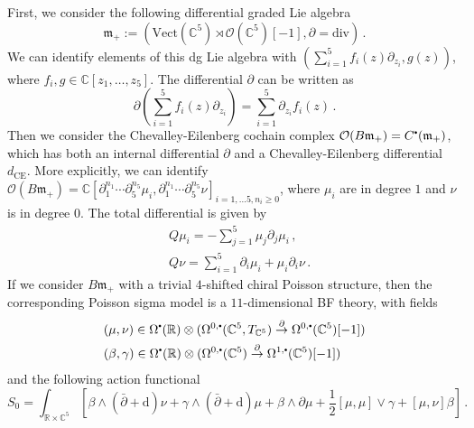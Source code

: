 \documentclass[11pt]{article}
\newcommand{\C}{\mathbb{C}}
\newcommand{\R}{\mathbb{R}}
\newcommand{\CE}{Chevalley-Eilenberg }
\newcommand\sbullet[1][.5]{\mathbin{\vcenter{\hbox{\scalebox{#1}{$\bullet$}}}}}
\numberwithin{equation}{section}
\begin{document}
First, we consider the following differential graded Lie algebra
\begin{equation}
\mathfrak{m}_+ := (\mathrm{Vect}(\C^5) \rtimes \mathcal{O}(\C^5)[-1], \partial = \mathrm{div} )\,.
\end{equation}
We can identify elements of this dg Lie algebra with $(\sum_{i=1}^5f_i(z)\partial_{z_i},g(z))$, where $f_i,g \in \C[z_1,\dots,z_5]$. The differential $\partial$ can be written as
\begin{equation}
	\partial(\sum_{i=1}^5f_i(z)\partial_{z_i}) = \sum_{i=1}^5\partial_{z_i}f_i(z)\,.
\end{equation}
Then we consider the \CE cochain complex $\mathcal{O}(B\mathfrak{m}_+) = C^{\sbullet}(\mathfrak{m}_+)$, which has both an internal differential $\partial$ and a \CE differential $d_{\mathrm{CE}}$. More explicitly, we can identify $\mathcal{O}(B\mathfrak{m}_+) = \C[\partial_1^{n_1}\cdots \partial_5^{n_5}\mu_i,\partial_1^{n_1}\cdots \partial_5^{n_5}\nu]_{i = 1,\dots 5, n_i \geq 0}$, where $\mu_i$ are in degree $1$ and $\nu$ is in degree $0$. The total differential is given by
\begin{equation}
	\begin{aligned}
		&Q\mu_i = -\sum_{j = 1}^5\mu_j\partial_j\mu_i\,,\\
		&Q\nu = \sum_{i = 1}^5 \partial_i\mu_i + \mu_i\partial_i\nu\,.
	\end{aligned}
\end{equation}
If we consider $B\mathfrak{m}_+$ with a trivial $4$-shifted chiral Poisson structure, then the corresponding Poisson sigma model is a $11$-dimensional BF theory, with fields
\begin{equation}
\begin{aligned}
		&(\mu,\nu) \in \Omega^{\sbullet}(\R)\otimes (\Omega^{0,\sbullet}(\C^5,T_{\C^5}) \overset{\partial}{\to} \Omega^{0,\sbullet}(\C^5)[-1])\\
		&(\beta,\gamma) \in \Omega^{\sbullet}(\R)\otimes (\Omega^{0,\sbullet}(\C^5) \overset{\partial}{\to} \Omega^{1,\sbullet}(\C^5)[-1])
\end{aligned}
\end{equation}
and the following action functional
\begin{equation}
	S_{0} = \int_{\R\times\C^5} \left[ \beta \wedge (\bar{\partial} + \mathrm{d})\nu + \gamma \wedge (\bar{\partial} + \mathrm{d})\mu + \beta \wedge \partial \mu + \frac{1}{2}[\mu, \mu] \vee \gamma + [\mu, \nu]\beta \right]\,.
\end{equation}
\end{document}
